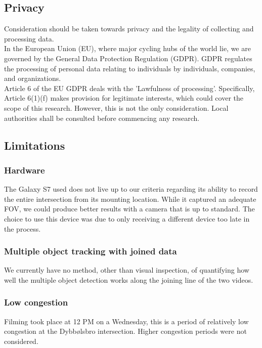 \subsection{Privacy}

Consideration should be taken towards privacy and the legality of collecting and processing data.
\ \\

In the European Union (EU), where major cycling hubs of the world lie, we are governed by the General Data Protection Regulation (GDPR). GDPR regulates the processing of personal data 
relating to individuals by individuals, companies, and organizations.
\ \\

Article 6 of the EU GDPR deals with the 'Lawfulness of processing'. Specifically, Article 6(1)(f)
makes provision for legitimate interests, which could cover the scope of this research.
However, this is not the only consideration. Local authorities shall be consulted before commencing any research.

\subsection{Limitations}
\subsubsection{Hardware}
The Galaxy S7 used does not live up to our criteria regarding its 
ability to record the entire intersection from its mounting location. While it captured an adequate 
FOV, we could produce better results with a camera that is up to standard. The choice to use this device 
was due to only receiving a different device too late in the process.

\subsubsection{Multiple object tracking with joined data}
We currently have no method, other than visual inspection, of quantifying how well the multiple object 
detection works along the joining line of the two videos.

\subsubsection{Low congestion}
Filming took place at 12 PM on a Wednesday, this is a period of relatively low congestion at the Dybbølsbro intersection. 
Higher congestion periods were not considered.
\ \\

